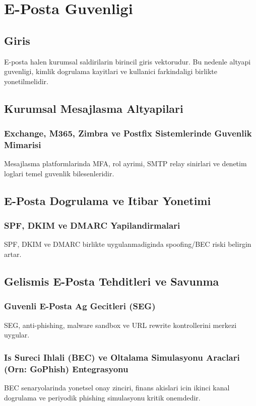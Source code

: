 ﻿\chapter{E-Posta Guvenligi}

\section*{Giris}
E-posta halen kurumsal saldirilarin birincil giris vektorudur. Bu nedenle altyapi guvenligi, kimlik dogrulama kayitlari ve kullanici farkindaligi birlikte yonetilmelidir.

\section{Kurumsal Mesajlasma Altyapilari}
\subsection{Exchange, M365, Zimbra ve Postfix Sistemlerinde Guvenlik Mimarisi}
Mesajlasma platformlarinda MFA, rol ayrimi, SMTP relay sinirlari ve denetim loglari temel guvenlik bilesenleridir.

\section{E-Posta Dogrulama ve Itibar Yonetimi}
\subsection{SPF, DKIM ve DMARC Yapilandirmalari}
SPF, DKIM ve DMARC birlikte uygulanmadiginda spoofing/BEC riski belirgin artar.

\section{Gelismis E-Posta Tehditleri ve Savunma}
\subsection{Guvenli E-Posta Ag Gecitleri (SEG)}
SEG, anti-phishing, malware sandbox ve URL rewrite kontrollerini merkezi uygular.

\subsection{Is Sureci Ihlali (BEC) ve Oltalama Simulasyonu Araclari (Orn: GoPhish) Entegrasyonu}
BEC senaryolarinda yonetsel onay zinciri, finans akislari icin ikinci kanal dogrulama ve periyodik phishing simulasyonu kritik onemdedir.
